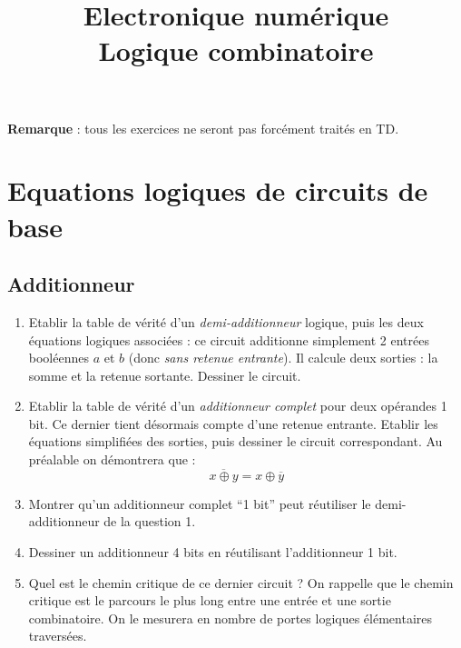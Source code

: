 \documentclass[a4paper,11pt]{article}
\title{{\Huge Electronique numérique}\\Logique combinatoire}
\date{}
\begin{document}
\maketitle

{\bf Remarque} : tous les exercices ne seront pas forcément traités en TD.

\section{Equations logiques de circuits de base}

\subsection{Additionneur}
\begin{enumerate}
\item Etablir la table de vérité d'un {\it demi-additionneur} logique, puis les deux équations logiques associées : ce circuit additionne simplement 2 entrées booléennes $a$ et $b$ (donc {\it sans retenue entrante}). Il calcule deux sorties : la somme et la retenue sortante. Dessiner le circuit.
\item Etablir la table de vérité d'un {\it additionneur complet} pour deux opérandes 1 bit. Ce dernier tient désormais compte d'une retenue entrante. Etablir les équations simplifiées des sorties, puis dessiner le circuit correspondant. Au préalable on démontrera que :
$$\overline{x\oplus y}=x \oplus \overline{y}$$
\item Montrer qu'un additionneur complet ``1 bit'' peut réutiliser le demi-additionneur de la question 1.
\item Dessiner un additionneur 4 bits en réutilisant l'additionneur 1 bit.
\item Quel est le chemin critique de ce dernier circuit ? On rappelle que le chemin critique est le parcours le plus long entre une entrée et une sortie combinatoire. On le mesurera en nombre de portes logiques élémentaires traversées.
\end{enumerate}
\end{document}
